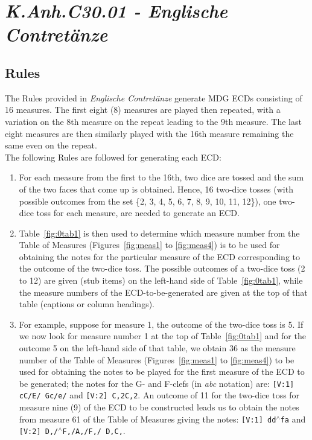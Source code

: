 \documentclass[letterpaper,x11names,svgnames,10pt]{article}
\begin{document}
\section{\em K.Anh.C30.01 - Englische Contret\"{a}nze}

\subsection{Rules}\label{genRules}

The Rules provided in {\em Englische Contret\"{a}nze} generate MDG ECDs consisting of 16 measures.  The first eight (8) measures are played then repeated, with a variation on the 8th measure on the repeat leading to the 9th measure.  The last eight measures are then similarly played with the 16th measure remaining the same even on the repeat. \\

The following Rules are followed for generating each ECD:
\begin{enumerate}
	\item [1.] For each measure from the first to the 16th, two dice are tossed and the sum of the two faces that come up is obtained.  Hence, 16 two-dice tosses (with possible outcomes from the set \{2, 3, 4, 5, 6, 7, 8, 9, 10, 11, 12\}), one two-dice toss for each measure, are needed to generate an ECD.   
	\item [2.] Table~\ref{fig:0tab1} is then used to determine which measure number from the Table of Measures (Figures~\ref{fig:meas1} to \ref{fig:meas4}) is to be used for obtaining the notes for the particular measure of the ECD corresponding to the outcome of the two-dice toss.  The possible outcomes of a two-dice toss (2 to 12) are given (stub items) on the left-hand side of Table~\ref{fig:0tab1}, while the measure numbers of the ECD-to-be-generated are given at the top of that table (captions or column  headings).
	\item [3.]  For example, suppose for measure 1, the outcome of the two-dice toss is 5.  If we now look for measure number 1 at the top of Table~\ref{fig:0tab1} and for the outcome 5 on the left-hand side of that table, we obtain 36 as the measure number of the Table of Measures (Figures~\ref{fig:meas1} to \ref{fig:meas4}) to be used for obtaining the notes to be played for the first measure of the ECD to be generated; the notes for the G- and F-clefs (in {\it abc} notation) are:  {\tt [V:1] cC/E/ Gc/e/} and {\tt [V:2] C,2C,2}. An outcome of 11 for the two-dice toss for measure nine (9) of the ECD to be constructed leads us to obtain the notes from measure 61 of the Table of Measures giving the notes: {\tt [V:1] dd$^\wedge$fa} and {\tt [V:2] D,/$^\wedge$F,/A,/F,/ D,C,}.
\end{enumerate}   
\end{document}
